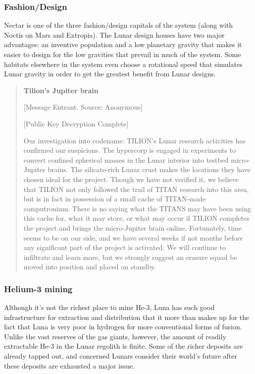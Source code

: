\subsubsection{Fashion/Design} \label{sec:fashiondesign} 

Nectar is one of the three fashion/design capitals of the system (along with Noctis on Mars and Extropia). The Lunar design houses have two major advantages: an inventive population and a low planetary gravity that makes it easier to design for the low gravities that prevail in much of the system. Some habitats elsewhere in the system even choose a rotational speed that simulates Lunar gravity in order to get the greatest benefit from Lunar designs. 

\begin{quotation} \textbf{Tilion's Jupiter brain} 

[Message Entrant. Source: Anonymous] 

[Public Key Decryption Complete] 

Our investigation into codename: TILION's Lunar research activities has confirmed our suspicions. The hypercorp is engaged in experiments to convert confined spherical masses in the Lunar interior into testbed micro-Jupiter brains. The silicate-rich Lunar crust makes the locations they have chosen ideal for the project. Though we have not verified it, we believe that TILION not only followed the trail of TITAN research into this area, but is in fact in possession of a small cache of TITAN-made computronium. There is no saying what the TITANS may have been using this cache for, what it may store, or what may occur if TILION completes the project and brings the micro-Jupiter brain online. Fortunately, time seems to be on our side, and we have several weeks if not months before any significant part of the project is activated. We will continue to infiltrate and learn more, but we strongly suggest an erasure squad be moved into position and placed on standby. \end{quotation} 

\subsubsection{Helium-3 mining} \label{sec:helium-3-mining} 

Although it's not the richest place to mine He-3, Luna has such good infrastructure for extraction and distribution that it more than makes up for the fact that Luna is very poor in hydrogen for more conventional forms of fusion. Unlike the vast reserves of the gas giants, however, the amount of readily extractable He-3 in the Lunar regolith is finite. Some of the richer deposits are already tapped out, and concerned Lunars consider their world's future after these deposits are exhausted a major issue. 

